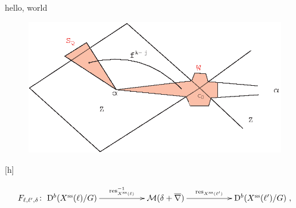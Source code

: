 \documentclass{amsart}
\begin{document}
hello, world

\begin{figure}[h]
\includegraphics{graphics.eps}
\end{figure}[h]

\[
F_{\ell, \ell', \delta} \colon \xymatrix{ \mathrm{D}^b(X^{\mathrm{ss}}(\ell) / G) \ar[rr]^-{\operatorname{res}_{X^{\mathrm{ss}}(\ell)}^{-1}} & & \mathcal{M}(\delta + \overline{\nabla}) \ar[rr]^-{\operatorname{res}_{X^{\mathrm{ss}}(\ell')}} & & \mathrm{D}^b(X^{\mathrm{ss}}(\ell')/G)},
\]
\end{document}
